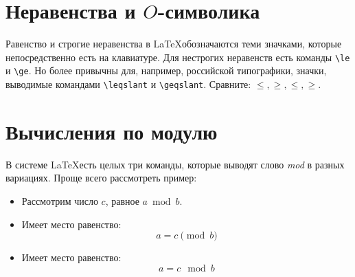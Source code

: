 \section{Неравенства и \(O\)-символика}
\par Равенство и строгие неравенства в \LaTeX обозначаются теми значками, которые непосредственно есть на клавиатуре. Для нестрогих неравенств есть команды \verb"\le" и \verb"\ge". Но более привычны для, например, российской типографики, значки, выводимые командами \verb"\leqslant" и \verb"\geqslant". Сравните: \(\le,\ge,\leqslant,\geqslant\).

\section{Вычисления по модулю}
\par В системе \LaTeX есть целых три команды, которые выводят слово \emph{mod} в разных вариациях. Проще всего рассмотреть пример:
\begin{itemize}
\item Рассмотрим число \(c\), равное \(a\bmod b\).
\item Имеет место равенство: \[a=c\pmod{b}\]
\item Имеет место равенство: \[a=c\mod b\]
\end{itemize}